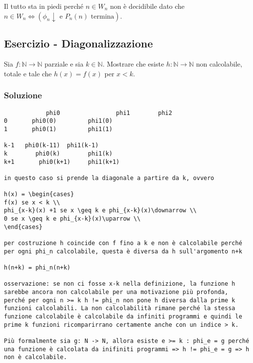 Il tutto sta in piedi perché $ n \in W_n $ non è decidibile dato che $ n \in W_n \Leftrightarrow (\phi_n \downarrow \text{ e } P_n(n) \text{ termina}) $.

\subsection{Esercizio - Diagonalizzazione}

Sia $ f : \mathbb{N} \rightarrow \mathbb{N} $ parziale e sia $ k \in \mathbb{N} $. Mostrare che esiste $ h : \mathbb{N} \rightarrow \mathbb{N} $ non calcolabile, totale e tale che $ h(x) = f(x) $ per $ x < k $.

\subsubsection{Soluzione}

\begin{verbatim}
			phi0 				phi1		phi2
0		phi0(0)			phi1(0)
1       phi0(1)         phi1(1)

k-1   phi0(k-11)  phi1(k-1)
k        phi0(k)		phi1(k)
k+1       phi0(k+1)		phi1(k+1)

in questo caso si prende la diagonale a partire da k, ovvero

h(x) = \begin{cases}
f(x) se x < k \\
phi_{x-k}(x) +1 se x \geq k e phi_{x-k}(x)\downarrow \\
0 se x \geq k e phi_{x-k}(x)\uparrow \\
\end{cases}

per costruzione h coincide con f fino a k e non è calcolabile perché per ogni phi_n calcolabile, questa è diversa da h sull'argomento n+k

h(n+k) = phi_n(n+k)

osservazione: se non ci fosse x-k nella definizione, la funzione h sarebbe ancora non calcolabile per una motivazione più profonda, perché per ogni n >= k h != phi_n non pone h diversa dalla prime k funzioni calcolabili. La non calcolabilità rimane perché la stessa funzione calcolabile è calcolabile da infiniti programmi e quindi le prime k funzioni ricomparirrano certamente anche con un indice > k.

Più formalmente sia g: N -> N, allora esiste e >= k : phi_e = g perché una funzione è calcolata da inifiniti programmi => h != phi_e = g => h non è calcolabile.
\end{verbatim}


